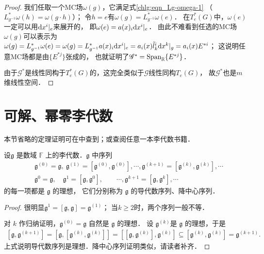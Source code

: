 \begin{proof}
    我们任取一个MC场$\omega(g)$，它满足式\eqref{chlg:eqn_Lg-omega-1}
    （$L_{g^{-1}}^* \omega(h)= \omega(g \cdot h)$）；
    令$h=e$有$\omega(g)=L_{g^{-1}}^* \omega(e) $．
    在$T_e^*(G)$中，$\omega(e)$一定可以用${\rm d}x^i|_{e}$来展开的，
    即$\omega(e)= a(x)_i{\rm d}x^i|_{e}$．
    由此不难看到任选的MC场$\omega(g)$可以表示为
    $\omega(g)=L_{g^{-1}}^* \omega(e)=\omega(g)=L_{g^{-1}}^* a(x)_i{\rm d}x^i|_{e}
    = a_i(x) \tilde{l}^i_k {\rm d}x^k |_{g}= a_i(x) E^{*i}$；
    这说明任意MC场都是由$\{E^{*j}\}$张成的，
    也就证明了$\mathscr{G}^*={\rm Span}_{\mathbb{R}}\{E^{*j}\}$．
    
    由于$\mathscr{G}^*$是线性同构于$T_e^*(G)$的，这完全类似于$\mathscr{G}$线性同构$T_e(G)$，
    故$\mathscr{G}^*$也是$m$维线性空间．
\end{proof}





\section{可解、幂零李代数}\label{chlg:sec_sn}

本节省略的定理证明可在\parencite[\S 4.1-\S 4.2]{huangxg-2024}中查到；或查阅任意一本李代数书籍．

\begin{proposition}
    设$\mathfrak{g}$ 是数域 $\mathbb{F}$ 上的李代数．$\mathfrak{g}$ 中序列 
    \begin{align*}
    &\mathfrak{g}^{(0)}=\mathfrak{g}, \ 
    \mathfrak{g}^{(1)}=\left[\mathfrak{g}^{(0)}, \mathfrak{g}^{(0)}\right],\cdots,
    \mathfrak{g}^{(k+1)}=\left[\mathfrak{g}^{(k)}, \mathfrak{g}^{(k)}\right],\cdots \\
    &\mathfrak{g}^0=\mathfrak{g}, \quad
    \mathfrak{g}^{1}=\left[\mathfrak{g}, \mathfrak{g}^{0}\right],  \qquad  \cdots,
    \mathfrak{g}^{k+1}=\left[\mathfrak{g}, \mathfrak{g}^k\right], \cdots    
    \end{align*}
    的每一项都是 $\mathfrak{g}$ 的理想，
    它们分别称为 $\mathfrak{g}$ 的{\heiti 导代数序列}、{\heiti 降中心序列}．
\end{proposition}
\begin{proof}
    很明显$\mathfrak{g}^{1}=\left[\mathfrak{g}, \mathfrak{g}\right]=\mathfrak{g}^{(1)}$；
    当$k\geqslant 2$时，两个序列一般不等．
    
    
    对 $k$ 作归纳证明，$\mathfrak{g}^{(0)}=\mathfrak{g}$ 自然是 $\mathfrak{g}$ 的理想．
    设 $\mathfrak{g}^{(k)}$是 $\mathfrak{g}$ 的理想，于是 
    \begin{align*}
        \left[\mathfrak{g}, \mathfrak{g}^{(k+1)}\right]=\left[\mathfrak{g},\left[\mathfrak{g}^{(k)}, \mathfrak{g}^{(k)}\right]\right]=\left[\left[\mathfrak{g}, \mathfrak{g}^{(k)}\right], \mathfrak{g}^{(k)}\right] \subseteq\left[\mathfrak{g}^{(k)}, \mathfrak{g}^{(k)}\right]=\mathfrak{g}^{(k+1)} .
    \end{align*}
    上式说明导代数序列是理想．降中心序列证明类似，请读者补齐．
\end{proof}

